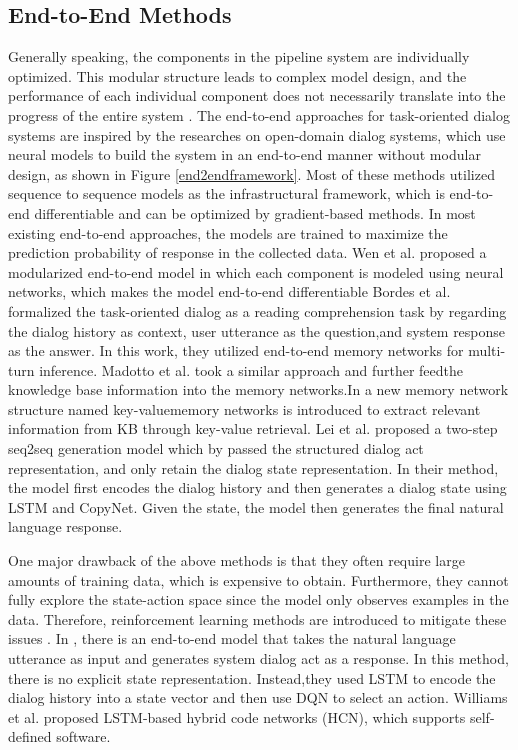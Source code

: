 \documentclass[10pt,twocolumn,letterpaper]{article}
\begin{document}
\subsection{End-to-End Methods}
Generally speaking, the components in the pipeline system are individually optimized. This modular structure leads to complex model design, and the performance of each individual component does not necessarily translate into the progress of the entire system \cite{gao2018neural}. The end-to-end  approaches for task-oriented dialog systems are inspired by the researches on  open-domain  dialog  systems,  which use neural  models to build the system in an end-to-end manner without modular design, as shown in Figure \ref{end2endframework}. Most of these methods utilized sequence to sequence models as the infrastructural framework, which is end-to-end differentiable and can be optimized by gradient-based methods. In  most  existing  end-to-end  approaches,  the models are trained to maximize the prediction  probability of response in  the collected  data.   Wen  et  al.  \cite{DBLP:conf/eacl/Rojas-BarahonaG17}  proposed  a  modularized end-to-end model in which each component is modeled using neural networks, which makes the model end-to-end  differentiable Bordes  et  al. \cite{bordes2016learning}formalized  the  task-oriented dialog as a reading comprehension task by regarding the dialog history as context, user utterance as the question,and system response as the answer. In this work, they utilized end-to-end memory networks for multi-turn inference. Madotto et al. \cite{madotto2018mem2seq} took a similar approach and further feedthe knowledge base information into the memory networks.In \cite{eric2017key}  a  new  memory  network  structure  named  key-valuememory networks is introduced to extract relevant information from KB through key-value retrieval. Lei et al. \cite{lei2018sequicity} proposed a two-step seq2seq generation model which by passed the structured dialog act representation, and only retain the dialog state representation. In their method, the model first encodes the dialog history and then generates a dialog state using LSTM and CopyNet.  Given the state, the model then generates the final natural language response.

One major drawback of the above methods is that they often require large amounts of training data, which is expensive to obtain.  Furthermore, they cannot fully explore the state-action space since the model only observes examples in the data. Therefore, reinforcement learning methods are introduced to mitigate these issues \cite{lei2018sequicity,zhao2016towards,williams2017hybrid,dhingra2016towards,li2017end,liu2017iterative}.  In \cite{zhao2016towards}, there is an end-to-end  model  that  takes  the  natural  language  utterance as input and generates system dialog act as a response.   In this method, there is no explicit state representation. Instead,they used LSTM to encode the dialog history into a state vector and then use DQN to select an action. Williams et al. \cite{williams2017hybrid} proposed LSTM-based hybrid code networks (HCN), which supports self-defined software.
\end{document}
